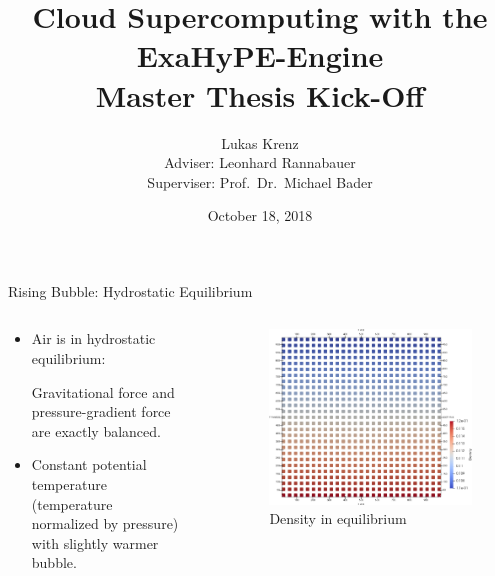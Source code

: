\documentclass{beamer}
\title{Cloud Supercomputing with the ExaHyPE-Engine\\Master Thesis Kick-Off}
\author{Lukas Krenz\\Adviser: Leonhard Rannabauer\\Superviser: Prof.\ Dr.\ Michael Bader}
\date{October 18, 2018}
\institute{\textsc{tum}, Chair for Scientific Computing}
\begin{document}
\maketitle
\begin{frame}{Rising Bubble: Hydrostatic Equilibrium}
  \begin{columns}
    \begin{column}[t]{0.5\textwidth}
      \begin{itemize}
      \item 
  Air is in hydrostatic equilibrium:

  Gravitational force and pressure-gradient force are exactly balanced.

  \item Constant potential temperature (temperature normalized by pressure) with slightly warmer bubble.
        
  \end{itemize}
    \end{column}~%
    \begin{column}[t]{0.5\textwidth}
      \begin{figure}[h]
\includegraphics[width=1.0\textwidth]{hydrostatic_density}
\caption{Density in equilibrium}
\end{figure}
    \end{column}
  \end{columns}
\end{frame}
\end{document}
